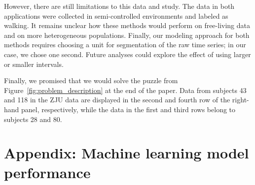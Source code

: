  
However, there are still limitations to this data and study. The data in both applications were collected in semi-controlled environments and labeled as walking. It remains unclear how these methods would perform on free-living data and on more heterogeneous populations.  Finally, our modeling approach for both methods requires choosing a unit for segmentation of the raw time series; in our case, we chose one second. Future analyses could explore the effect of using larger or smaller intervals. 

Finally, we promised that we would solve the puzzle from Figure~\ref{fig:problem_description} at the end of the paper. Data from subjects 43 and 118 in the ZJU data are displayed in the second and fourth row of the right-hand panel, respectively, while the data in the first and third rows belong to subjects 28 and 80. 

 



\clearpage
\section{Appendix: Machine learning model performance}


